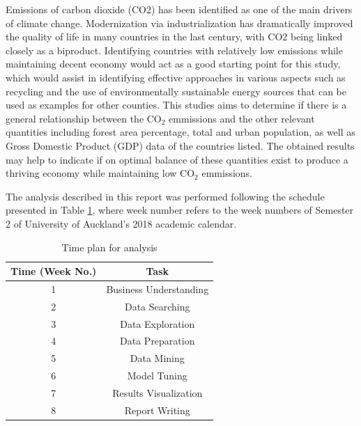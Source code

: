 \documentclass[11pt,a4paper,titlepage]{article}
\newcommand{\blankline}{\quad\pagebreak[2]}
\begin{document}
\blankline

Emissions of carbon dioxide (CO2) has been identified as one of the main drivers of climate change. Modernization via industrialization has dramatically improved the quality of life in many countries in the last century, with CO2 being linked closely as a biproduct. Identifying countries with relatively low emissions while maintaining decent economy would act as a good starting point for this study, which would assist in identifying effective approaches in various aspects such as recycling and the use of environmentally sustainable energy sources that can be used as examples for other counties. This studies aims to determine if there is a general relationship between the CO$_{2}$ emmissions and the other relevant quantities including forest area percentage, total and urban population, as well as Gross Domestic Product (GDP) data of the countries listed. The obtained results may help to indicate if on optimal balance of these quantities exist to produce a thriving economy while maintaining low CO$_{2}$ emmissions.

\blankline

The analysis described in this report was performed following the schedule presented in Table \ref{ProjectPlan}, where week number refers to the week numbers of Semester 2 of University of Auckland's 2018 academic calendar.

\begin{table}[htbp!]
    \begin{center}
        \begin{tabular}{ |c|c| } 
        \hline
        Time (Week No.) & Task \\ 
        \hline
        1 & Business Understanding \\
        2 & Data Searching \\
        3 & Data Exploration \\
        4 & Data Preparation \\
        5 & Data Mining \\
        6 & Model Tuning \\
        7 & Results Visualization \\
        8 & Report Writing \\
        \hline
        \end{tabular}
        \caption{Time plan for analysis}
        \label{ProjectPlan}
    \end{center}
\end{table}
\end{document}
